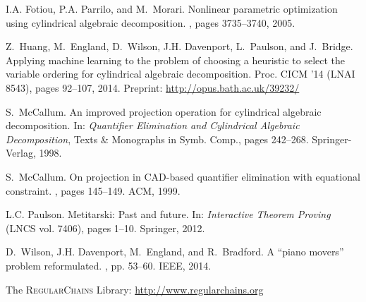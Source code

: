 \documentclass[runningheads,a4paper]{llncs}
\begin{document}
\begin{thebibliography}{99}
I.A. Fotiou, P.A. Parrilo, and M.~Morari.
\newblock Nonlinear parametric optimization using cylindrical algebraic
  decomposition.
, pages 3735--3740, 2005.

Z.~Huang, M.~England, D.~Wilson, J.H. Davenport, L.~Paulson, and J.~Bridge.
\newblock Applying machine learning to the problem of choosing a heuristic to
  select the variable ordering for cylindrical algebraic decomposition.
 Proc. CICM '14 (LNAI 8543), pages 92--107, 2014.  
Preprint: \url{http://opus.bath.ac.uk/39232/}

S.~McCallum.
\newblock An improved projection operation for cylindrical algebraic
  decomposition.
\newblock In: {\em Quantifier Elimination and Cylindrical Algebraic Decomposition}, Texts \& Monographs in Symb. Comp., pages 242--268. Springer-Verlag, 1998.

S.~McCallum.
\newblock On projection in {CAD}-based quantifier elimination with equational
  constraint.
, pages 145--149. ACM, 1999.

L.C. Paulson.
\newblock Metitarski: Past and future.
\newblock In: {\em Interactive Theorem Proving} (LNCS vol. 7406), pages 1--10. Springer, 2012.

D.~Wilson, J.H. Davenport, M.~England, and R.~Bradford.
\newblock A ``piano movers'' problem reformulated.
, pp. 53--60. IEEE, 2014.

The \textsc{RegularChains} Library: \url{http://www.regularchains.org}

\end{thebibliography}
\end{document}
